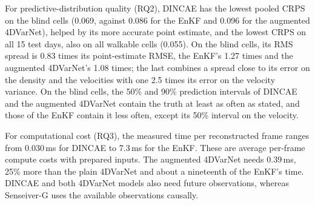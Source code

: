 \documentclass[english, 12pt, a4paper, elec, utf8, a-2b, online]{aaltothesis}
\begin{document}
For predictive-distribution quality (RQ2), DINCAE has the lowest pooled CRPS
on the blind cells (0.069, against 0.086 for the EnKF and 0.096 for the
augmented 4DVarNet), helped by its more accurate point estimate, and the lowest
CRPS on all 15 test days, also on all walkable cells (0.055). On the blind cells, its RMS spread is 0.83 times its point-estimate RMSE, the EnKF's 1.27
times and the augmented 4DVarNet's 1.08 times; the last combines a spread close
to its error on the density and the velocities with one 2.5 times its error on
the velocity variance. On the blind cells, the 50\% and 90\% prediction intervals
of DINCAE and the augmented 4DVarNet contain the truth at least as often as
stated, and those of the EnKF contain it less often, except its 50\% interval on
the velocity.

For computational cost (RQ3), the measured time per reconstructed frame ranges from
0.030\,ms for DINCAE to 7.3\,ms for the EnKF. These are average per-frame
compute costs with prepared inputs. The augmented 4DVarNet needs 0.39\,ms, 25\%
more than the plain 4DVarNet and about a nineteenth of the EnKF's time.
DINCAE and both 4DVarNet models also need
future observations, whereas Senseiver\nobreakdash-G uses the available observations
causally.
\end{document}

